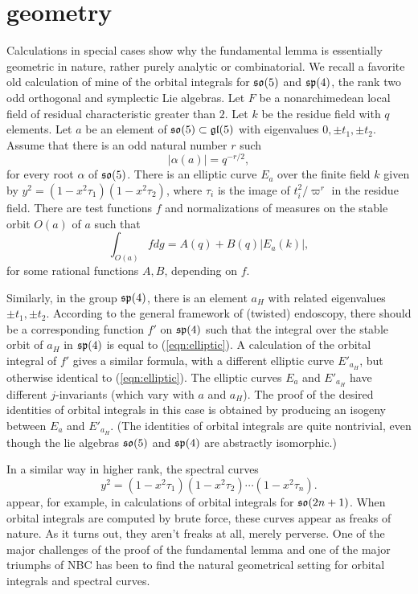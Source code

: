 \documentclass[brochure,english,12pt]{bourbaki}
\def\so{\frak{so}}
\def\sp{\frak{sp}}
\def\gl{\frak{gl}}
\begin{document}
\section{geometry}

Calculations in special cases show why the fundamental lemma is
essentially geometric in nature, rather purely analytic or
combinatorial. We recall a favorite old calculation of mine of the
orbital integrals for $\so(5)$ and $\sp(4)$, the rank two odd
orthogonal and symplectic Lie algebras.  Let $F$ be a nonarchimedean
local field of residual characteristic greater than $2$.  Let $k$ be
the residue field with $q$ elements.  Let $a$ be an element of
$\so(5)\subset \gl(5)$ with eigenvalues $0,\pm t_1,\pm t_2$.  Assume
that there is an odd natural number $r$ such
\[
|\alpha(a)| = q^{-r/2},
\]
for every root $\alpha$ of $\so(5)$. 
There is an elliptic curve $E_a$ over the finite field $k$ given by
$y^2 = (1-x^2\tau_1)(1-x^2\tau_2)$, where $\tau_i$ is the image
of $t_i^2/\varpi^r$ in the residue field.  There are test functions $f$ and normalizations of
measures on the stable orbit $O(a)$ of $a$ such that
\begin{equation}\label{eqn:elliptic}
\int_{O(a)} f dg = A(q) + B(q) | E_a(k)|,
\end{equation}
for some rational functions $A,B$, depending on $f$.

Similarly, in the group $\sp(4)$, there is an element ${a_H}$ with related eigenvalues $\pm
t_1,\pm t_2$.  According to the general framework of (twisted) endoscopy, there
should be a corresponding function $f'$ on $\sp(4)$ such that the
integral over the stable orbit of ${a_H}$ in $\sp(4)$ is equal to
(\ref{eqn:elliptic}).  A calculation of the orbital integral of $f'$ gives a similar formula, with
a different elliptic curve $E'_{a_H}$, but otherwise identical to (\ref{eqn:elliptic}).
The elliptic curves $E_a$ and $E'_{a_H}$
have different $j$-invariants (which vary with $a$ and ${a_H}$).  The
proof of the desired identities of orbital integrals in this case is
obtained by producing an isogeny between $E_a$ and $E'_{a_H}$.  (The identities of orbital integrals are quite
nontrivial, even though the lie algebras $\so(5)$ and $\sp(4)$ are abstractly isomorphic.)

In a similar way in higher rank,  the spectral curves
\[
y^2 = (1-x^2 \tau_1)(1-x^2 \tau_2)\cdots (1-x^2 \tau_n).
\]
appear, for example, in calculations of orbital integrals for
$\so(2n+1)$.  When orbital integrals are computed by brute force,
these curves appear as freaks of nature.  As it turns
out, they aren't freaks at all, merely perverse.  One of the major
challenges of the proof of the fundamental lemma and one of the major
triumphs of NBC has been to find the natural geometrical setting for
orbital integrals and spectral curves.
\end{document}
